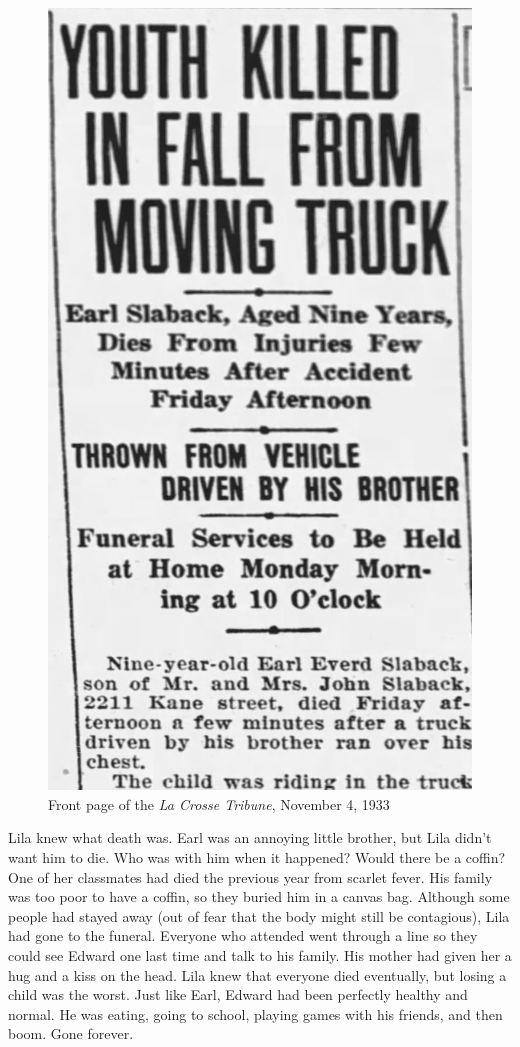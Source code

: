 \documentclass[
  letterpaper,
]{book}
\begin{document}
\begin{figure}[H]

{\centering \includegraphics[width=0.6\linewidth,height=\textheight,keepaspectratio]{images/Akou07cropped.jpg}

}

\caption{Front page of the \emph{La Crosse Tribune}, November 4, 1933}

\end{figure}%

Lila knew what death was. Earl was an annoying little brother, but Lila
didn't want him to die. Who was with him when it happened? Would there
be a coffin? One of her classmates had died the previous year from
scarlet fever. His family was too poor to have a coffin, so they buried
him in a canvas bag. Although some people had stayed away (out of fear
that the body might still be contagious), Lila had gone to the funeral.
Everyone who attended went through a line so they could see Edward one
last time and talk to his family. His mother had given her a hug and a
kiss on the head. Lila knew that everyone died eventually, but losing a
child was the worst. Just like Earl, Edward had been perfectly healthy
and normal. He was eating, going to school, playing games with his
friends, and then boom. Gone forever.
\end{document}
